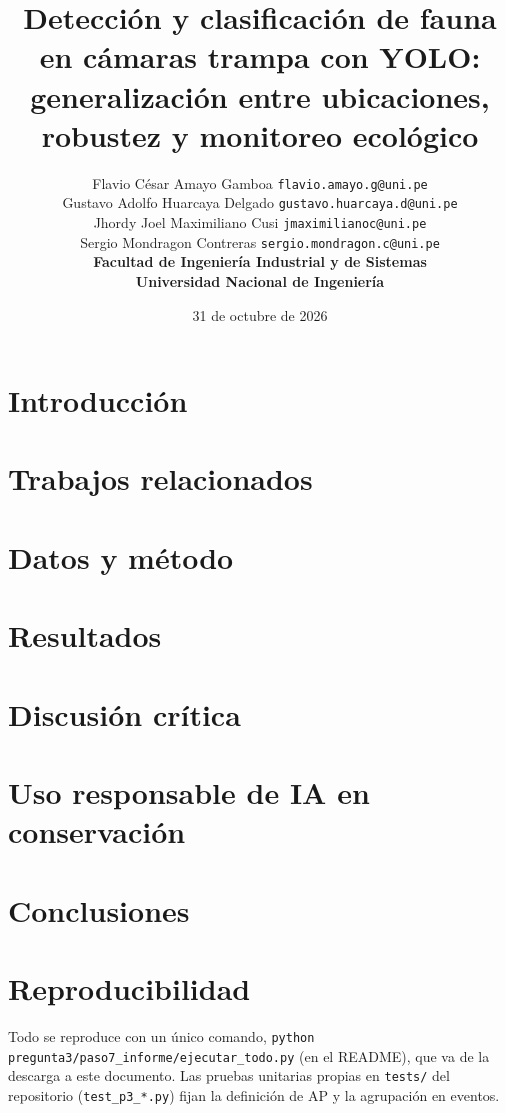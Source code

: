 \documentclass{article}
\title{Detección y clasificación de fauna en cámaras trampa con YOLO:
       generalización entre ubicaciones, robustez y monitoreo ecológico}
\author{%
  Flavio César Amayo Gamboa \quad \texttt{flavio.amayo.g@uni.pe} \\
  Gustavo Adolfo Huarcaya Delgado \quad \texttt{gustavo.huarcaya.d@uni.pe} \\
  Jhordy Joel Maximiliano Cusi \quad \texttt{jmaximilianoc@uni.pe} \\
  Sergio Mondragon Contreras \quad \texttt{sergio.mondragon.c@uni.pe} \\[0.6em]
  \textbf{Facultad de Ingeniería Industrial y de Sistemas} \\
  \textbf{Universidad Nacional de Ingeniería}
}
\date{31 de octubre de 2026}
\begin{document}
\maketitle

\begin{abstract}

\end{abstract}

\section{Introducción}


\section{Trabajos relacionados}


\section{Datos y método}


\section{Resultados}


\section{Discusión crítica}


\section{Uso responsable de IA en conservación}


\section{Conclusiones}


\section*{Reproducibilidad}
Todo se reproduce con un único comando, \texttt{python
pregunta3/paso7\_informe/ejecutar\_todo.py} (en el README), que va de la descarga
a este documento. Las pruebas unitarias propias en \texttt{tests/} del
repositorio (\texttt{test\_p3\_*.py}) fijan la definición de AP y la agrupación
en eventos.

{\small


}
\end{document}
